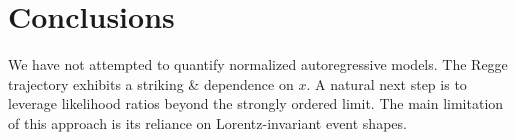 \section{Conclusions}\label{sec:conclusions}

We have not attempted to quantify normalized autoregressive models. The
Regge trajectory exhibits a striking & dependence on $x$. A natural next
step is to leverage likelihood ratios beyond the strongly ordered limit.
The main limitation of this approach is its reliance on
Lorentz-invariant event shapes.

